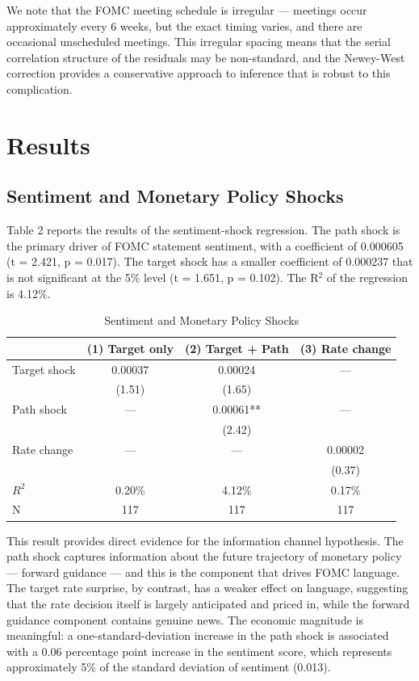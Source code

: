 \documentclass[12pt]{article}
\begin{document}
We note that the FOMC meeting schedule is irregular --- meetings occur approximately every 6 weeks, but the exact timing varies, and there are occasional unscheduled meetings. This irregular spacing means that the serial correlation structure of the residuals may be non-standard, and the Newey-West correction provides a conservative approach to inference that is robust to this complication.


\section{Results}

\subsection{Sentiment and Monetary Policy Shocks}

Table 2 reports the results of the sentiment-shock regression. The path shock is the primary driver of FOMC statement sentiment, with a coefficient of 0.000605 (t = 2.421, p = 0.017). The target shock has a smaller coefficient of 0.000237 that is not significant at the 5\% level (t = 1.651, p = 0.102). The R$^2$ of the regression is 4.12\%.

\begin{table}[htbp]\centering\caption{Sentiment and Monetary Policy Shocks}\label{tab:h1}
\begin{tabular}{lccc}\toprule
 & (1) Target only & (2) Target + Path & (3) Rate change \\\midrule
Target shock & 0.00037 & 0.00024 & --- \\
 & (1.51) & (1.65) & \\
Path shock & --- & 0.00061** & --- \\
 & & (2.42) & \\
Rate change & --- & --- & 0.00002 \\
 & & & (0.37) \\\midrule
$R^2$ & 0.20\% & 4.12\% & 0.17\% \\
N & 117 & 117 & 117 \\\bottomrule
\end{tabular}
\par\vspace{2pt}{\footnotesize Newey-West HAC standard errors with lag=4. t-statistics in parentheses. ** $p < 0.05$.}
\end{table}

This result provides direct evidence for the information channel hypothesis. The path shock captures information about the future trajectory of monetary policy --- forward guidance --- and this is the component that drives FOMC language. The target rate surprise, by contrast, has a weaker effect on language, suggesting that the rate decision itself is largely anticipated and priced in, while the forward guidance component contains genuine news. The economic magnitude is meaningful: a one-standard-deviation increase in the path shock is associated with a 0.06 percentage point increase in the sentiment score, which represents approximately 5\% of the standard deviation of sentiment (0.013).
\end{document}
